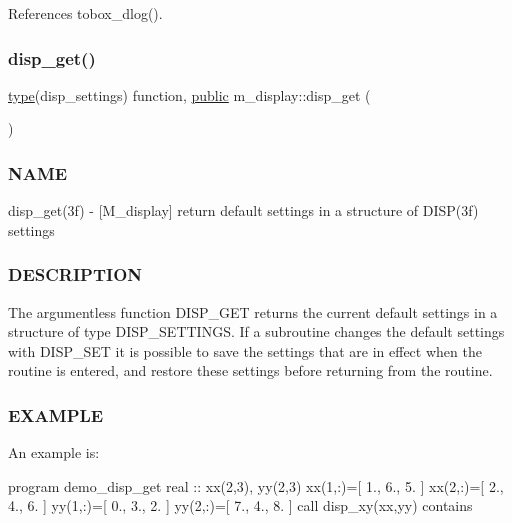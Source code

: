References tobox\+\_\+dlog().

\mbox{\label{namespacem__display_a6a49f987c37a95e67744950ecee69530}} 
\subsubsection{\texorpdfstring{disp\+\_\+get()}{disp\_get()}}
{\footnotesize\ttfamily \hyperlink{stop__watch_83_8txt_a70f0ead91c32e25323c03265aa302c1c}{type}(disp\+\_\+settings) function, \hyperlink{M__stopwatch_83_8txt_a2f74811300c361e53b430611a7d1769f}{public} m\+\_\+display\+::disp\+\_\+get (\begin{DoxyParamCaption}{ }\end{DoxyParamCaption})}



\subsubsection*{N\+A\+ME}

disp\+\_\+get(3f) -\/ \mbox{[}M\+\_\+display\mbox{]} return default settings in a structure of D\+I\+S\+P(3f) settings

\subsubsection*{D\+E\+S\+C\+R\+I\+P\+T\+I\+ON}

The argumentless function D\+I\+S\+P\+\_\+\+G\+ET returns the current default settings in a structure of type D\+I\+S\+P\+\_\+\+S\+E\+T\+T\+I\+N\+GS. If a subroutine changes the default settings with D\+I\+S\+P\+\_\+\+S\+ET it is possible to save the settings that are in effect when the routine is entered, and restore these settings before returning from the routine.

\subsubsection*{E\+X\+A\+M\+P\+LE}

An example is\+:

program demo\+\_\+disp\+\_\+get real \+:\+: xx(2,3), yy(2,3) xx(1,\+:)=\mbox{[} 1., 6., 5. \mbox{]} xx(2,\+:)=\mbox{[} 2., 4., 6. \mbox{]} yy(1,\+:)=\mbox{[} 0., 3., 2. \mbox{]} yy(2,\+:)=\mbox{[} 7., 4., 8. \mbox{]} call disp\+\_\+xy(xx,yy) contains

